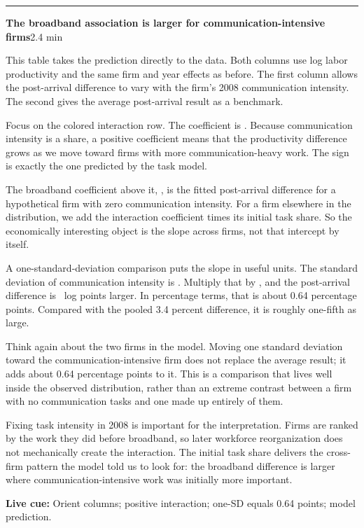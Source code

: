 \documentclass[11pt]{article}
\newcommand{\Cue}[1]{\par\nobreak\smallskip\noindent\textcolor{ScriptGray}{\footnotesize
  \textbf{Live cue:} #1}\par}
\newcommand{\scriptframe}[3]{%
  \Needspace{11\baselineskip}%
  \par\medskip\noindent\textcolor{ScriptBlue}{\rule{\linewidth}{0.55pt}}%
  \par\smallskip\noindent
  \textbf{#1}\hfill\textcolor{ScriptGray}{\small #2}\par\smallskip
  #3\par}
\begin{document}
\scriptframe{The broadband association is larger for communication-intensive firms}{2.4 min}{%
  This table takes the prediction directly to the data. Both columns use log
  labor productivity and the same firm and year effects as before. The first
  column allows the post-arrival difference to vary with the firm's 2008
  communication intensity. The second gives the average post-arrival result as
  a benchmark.

  Focus on the colored interaction row. The coefficient is \ResInteraction.
  Because communication intensity is a share, a positive coefficient means
  that the productivity difference grows as we move toward firms with more
  communication-heavy work. The sign is exactly the one predicted by the task
  model.

  The broadband coefficient above it, \ResInteractionIntercept, is the fitted
  post-arrival difference for a hypothetical firm with zero communication
  intensity. For a firm elsewhere in the distribution, we add the interaction
  coefficient times its initial task share. So the economically interesting
  object is the slope across firms, not that intercept by itself.

  A one-standard-deviation comparison puts the slope in useful units. The
  standard deviation of communication intensity is \ResCommSD. Multiply that by
  \ResInteraction, and the post-arrival difference is \ResCommSDGap\ log points
  larger. In percentage terms, that is about 0.64 percentage points. Compared
  with the pooled 3.4 percent difference, it is roughly one-fifth as large.

  Think again about the two firms in the model. Moving one standard deviation
  toward the communication-intensive firm does not replace the average result;
  it adds about 0.64 percentage points to it. This is a comparison that lives
  well inside the observed distribution, rather than an extreme contrast
  between a firm with no communication tasks and one made up entirely of them.

  Fixing task intensity in 2008 is important for the interpretation. Firms are
  ranked by the work they did before broadband, so later workforce
  reorganization does not mechanically create the interaction. The initial
  task share delivers the cross-firm pattern the model told us to look for:
  the broadband difference is larger where communication-intensive work was
  initially more important.
  \Cue{Orient columns; positive interaction; one-SD equals 0.64 points; model prediction.}
}
\end{document}
